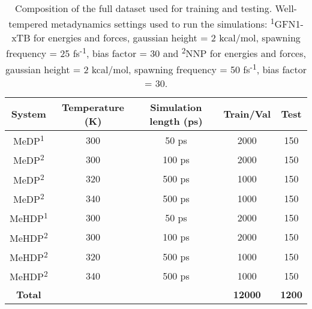 \begin{table}[htbp]
    \centering
    \caption{Composition of the full dataset used for training and testing. Well-tempered metadynamics settings used to run the simulations: \textsuperscript{1}GFN1-xTB for energies and forces, gaussian height = 2 kcal/mol, spawning frequency = 25 fs\textsuperscript{-1}, bias factor = 30 and  \textsuperscript{2}NNP for energies and forces, gaussian height = 2 kcal/mol, spawning frequency = 50 fs\textsuperscript{-1}, bias factor = 30.}
    \label{tab:full_dataset}
    \begin{tabular}{ccccc}
    \toprule
    \textbf{System} & \textbf{Temperature (K)} & \textbf{Simulation length (ps)} & \textbf{Train/Val} & \textbf{Test} \\
    \midrule
    MeDP\textsuperscript{1}  & 300 & 50 ps   & 2000 & 150 \\
    MeDP\textsuperscript{2}  & 300 & 100 ps & 2000 & 150 \\
    MeDP\textsuperscript{2}  & 320 & 500 ps  & 1000 & 150 \\
    MeDP\textsuperscript{2}  & 340 & 500 ps  & 1000 & 150 \\
    MeHDP\textsuperscript{1} & 300 & 50 ps  & 2000 & 150 \\
    MeHDP\textsuperscript{2} & 300 & 100 ps & 2000 & 150 \\
    MeHDP\textsuperscript{2} & 320 & 500 ps  & 1000 & 150 \\
    MeHDP\textsuperscript{2} & 340 & 500 ps  & 1000 & 150 \\
    \midrule
    \textbf{Total} & & & \textbf{12000} & \textbf{1200} \\
    \bottomrule
    \end{tabular}
\end{table}
